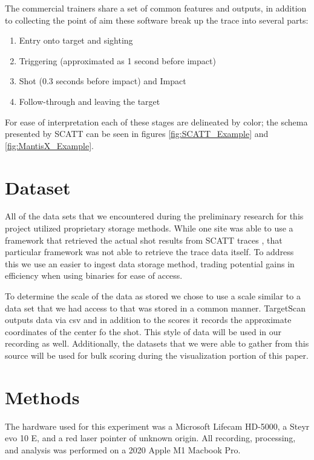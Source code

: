\documentclass[conference]{IEEEtran}
\begin{document}
The commercial trainers share a set of common features and outputs,
in addition to collecting the point of aim these software break up the trace into several parts:
\begin{enumerate}
	\item Entry onto target and sighting
	\item Triggering (approximated as 1 second before impact)
	\item Shot (0.3 seconds before impact)  and Impact
	\item Follow-through and leaving the target
\end{enumerate}
For ease of interpretation each of these stages are delineated by color; the schema presented by SCATT can be seen in figures 
\ref{fig:SCATT_Example} and
\ref{fig:MantisX_Example}.


\section{Dataset}

All of the data sets that we encountered during the preliminary research for this project utilized proprietary storage methods.
While one site was able to use a framework that retrieved the actual shot results from SCATT traces \cite{scatt-db}, that particular framework was not able to retrieve the trace data itself.
To address this we use an easier to ingest data storage method, trading potential gains in efficiency when using binaries for ease of access.

To determine the scale of the data as stored we chose to use a scale similar to a data set that we had access to that was stored in a common manner.
TargetScan \cite{targetscan} outputs data via csv and in addition to the scores it records the approximate coordinates of the center fo the shot. 
This style of data will be used in our recording as well.
Additionally, the datasets that we were able to gather from this source will be used for bulk scoring during the visualization portion of this paper.


\section{Methods}

The hardware used for this experiment was 
a Microsoft Lifecam HD-5000,
a Steyr evo 10 E,
and a red laser pointer of unknown origin.
All recording, processing, and analysis was performed on 
a 2020 Apple M1 Macbook Pro.
\end{document}
